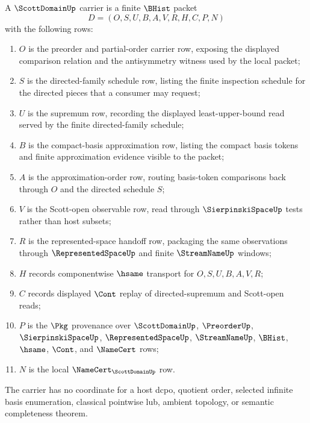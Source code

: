 \begin{definition}\label{def:scott-domain-carrier}
A $\ScottDomainUp$ carrier is a finite $\BHist$ packet
$$
D=(O,S,U,B,A,V,R,H,C,P,N)
$$
with the following rows:
\begin{enumerate}
\item $O$ is the preorder and partial-order carrier row, exposing the displayed comparison relation and the antisymmetry witness used by the local packet;
\item $S$ is the directed-family schedule row, listing the finite inspection schedule for the directed pieces that a consumer may request;
\item $U$ is the supremum row, recording the displayed least-upper-bound read served by the finite directed-family schedule;
\item $B$ is the compact-basis approximation row, listing the compact basis tokens and finite approximation evidence visible to the packet;
\item $A$ is the approximation-order row, routing basis-token comparisons back through $O$ and the directed schedule $S$;
\item $V$ is the Scott-open observable row, read through $\SierpinskiSpaceUp$ tests rather than host subsets;
\item $R$ is the represented-space handoff row, packaging the same observations through $\RepresentedSpaceUp$ and finite $\StreamNameUp$ windows;
\item $H$ records componentwise $\hsame$ transport for $O,S,U,B,A,V,R$;
\item $C$ records displayed $\Cont$ replay of directed-supremum and Scott-open reads;
\item $P$ is the $\Pkg$ provenance over $\ScottDomainUp$, $\PreorderUp$, $\SierpinskiSpaceUp$, $\RepresentedSpaceUp$, $\StreamNameUp$, $\BHist$, $\hsame$, $\Cont$, and $\NameCert$ rows;
\item $N$ is the local $\NameCert_{\ScottDomainUp}$ row.
\end{enumerate}
The carrier has no coordinate for a host dcpo, quotient order, selected infinite basis enumeration, classical pointwise lub, ambient topology, or semantic completeness theorem.
\end{definition}

